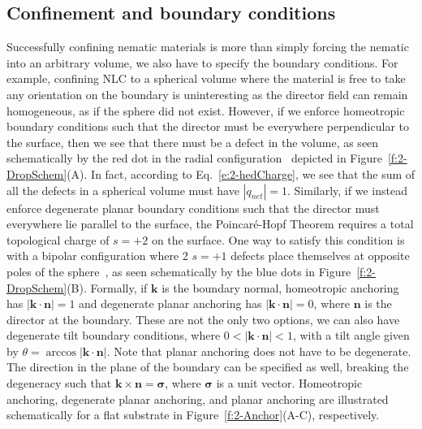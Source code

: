 \subsection{Confinement and boundary conditions}
Successfully confining nematic materials is more than simply forcing the nematic into an arbitrary volume, we also have to specify the boundary conditions.
For example, confining NLC to a spherical volume where the material is free to take any orientation on the boundary is uninteresting as the director field can remain homogeneous, as if the sphere did not exist.
However, if we enforce homeotropic boundary conditions such that the director must be everywhere perpendicular to the surface, then we see that there must be a defect in the volume, as seen schematically by the red dot in the radial configuration~\cite{RN177} depicted in Figure~\ref{f:2-DropSchem}(A).
In fact, according to Eq.~\ref{e:2-hedCharge}, we see that the sum of all the defects in a spherical volume must have $|q_{net}| = 1$.
Similarly, if we instead enforce degenerate planar boundary conditions such that the director must everywhere lie parallel to the surface, the Poincar\'e-Hopf Theorem requires a total topological charge of $s = +2$ on the surface.
One way to satisfy this condition is with a bipolar configuration where 2 $s = +1$ defects place themselves at opposite poles of the sphere~\cite{RN177}, as seen schematically by the blue dots in Figure~\ref{f:2-DropSchem}(B).
Formally, if $\mathbf{k}$ is the boundary normal, homeotropic anchoring has $|\mathbf{k} \cdot \mathbf{n}| = 1$ and degenerate planar anchoring has $|\mathbf{k} \cdot \mathbf{n}| = 0$, where $\mathbf{n}$ is the director at the boundary.
These are not the only two options, we can also have degenerate tilt boundary conditions, where $0< |\mathbf{k} \cdot \mathbf{n}| < 1$, with a tilt angle given by $\theta = \arccos |\mathbf{k} \cdot \mathbf{n}| $.
Note that planar anchoring does not have to be degenerate.
The direction in the plane of the boundary can be specified as well, breaking the degeneracy such that $\mathbf{k} \times \mathbf{n} = \bm{\sigma}$, where $\bm{\sigma}$ is a unit vector.
Homeotropic anchoring, degenerate planar anchoring, and planar anchoring are illustrated schematically for a flat substrate in Figure~\ref{f:2-Anchor}(A-C), respectively.\\

